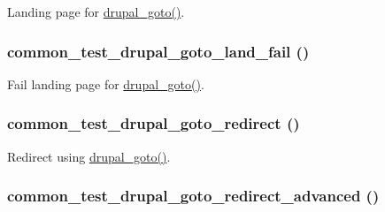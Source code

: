\label{common__test_8module_a51a37e16cde782af5f1ef1fcb0bd17be}
Landing page for \hyperlink{group__http__handling_ga5b68d7a934713d1d623b2b32a732235d}{drupal\_\-goto()}. \hypertarget{common__test_8module_ad10772459a2dce86e86db7d00fbca0c7}{
\subsubsection[{common\_\-test\_\-drupal\_\-goto\_\-land\_\-fail}]{\setlength{\rightskip}{0pt plus 5cm}common\_\-test\_\-drupal\_\-goto\_\-land\_\-fail ()}}
\label{common__test_8module_ad10772459a2dce86e86db7d00fbca0c7}
Fail landing page for \hyperlink{group__http__handling_ga5b68d7a934713d1d623b2b32a732235d}{drupal\_\-goto()}. \hypertarget{common__test_8module_abba823122539c8fec2c5ca988ccaf92b}{
\subsubsection[{common\_\-test\_\-drupal\_\-goto\_\-redirect}]{\setlength{\rightskip}{0pt plus 5cm}common\_\-test\_\-drupal\_\-goto\_\-redirect ()}}
\label{common__test_8module_abba823122539c8fec2c5ca988ccaf92b}
Redirect using \hyperlink{group__http__handling_ga5b68d7a934713d1d623b2b32a732235d}{drupal\_\-goto()}. \hypertarget{common__test_8module_a395b0f500add60064382c0a497818c9c}{
\subsubsection[{common\_\-test\_\-drupal\_\-goto\_\-redirect\_\-advanced}]{\setlength{\rightskip}{0pt plus 5cm}common\_\-test\_\-drupal\_\-goto\_\-redirect\_\-advanced ()}}

